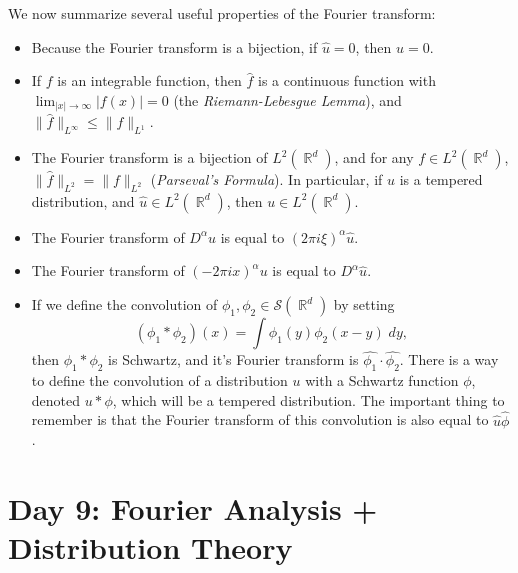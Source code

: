 \documentclass[answers]{exam}
\DeclareMathOperator{\RR}{\mathbb{R}}
\theoremstyle{problemstyle}
\newcommand{\1}[1]{\textbf{1}_{\left[#1\right]}} %
\begin{document}
\begin{questions}
We now summarize several useful properties of the Fourier transform:
%
\begin{itemize}
	\item Because the Fourier transform is a bijection, if $\widehat{u} = 0$, then $u = 0$.

	\item If $f$ is an integrable function, then $\widehat{f}$ is a continuous function with $\lim_{|x| \to \infty} |f(x)| = 0$ (the \emph{Riemann-Lebesgue Lemma}), and $\| \widehat{f} \|_{L^\infty} \leq \| f \|_{L^1}$.

	\item The Fourier transform is a bijection of $L^2(\RR^d)$, and for any $f \in L^2(\RR^d)$, $\| \widehat{f} \|_{L^2} = \| f \|_{L^2}$ (\emph{Parseval's Formula}). In particular, if $u$ is a tempered distribution, and $\widehat{u} \in L^2(\RR^d)$, then $u \in L^2(\RR^d)$.

	\item The Fourier transform of $D^\alpha u$ is equal to $(2 \pi i \xi)^\alpha \widehat{u}$.

	\item The Fourier transform of $(- 2 \pi i x)^\alpha u$ is equal to $D^\alpha \widehat{u}$.

	\item If we define the convolution of $\phi_1, \phi_2 \in \mathcal{S}(\RR^d)$ by setting
	\[ (\phi_1 * \phi_2)(x) = \int \phi_1(y) \phi_2(x - y)\; dy, \]
	then $\phi_1 * \phi_2$ is Schwartz, and it's Fourier transform is $\widehat{\phi_1} \cdot \widehat{\phi_2}$. There is a way to define the convolution of a distribution $u$ with a Schwartz function $\phi$, denoted $u * \phi$, which will be a tempered distribution. The important thing to remember is that the Fourier transform of this convolution is also equal to $\widehat{u} \widehat{\phi}$.
\end{itemize}







\newpage 
\section{Day 9: Fourier Analysis + Distribution Theory}


\end{questions}
\end{document}
